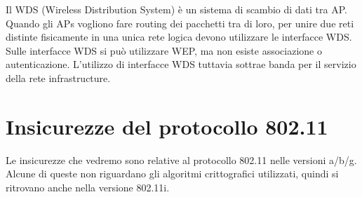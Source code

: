 Il WDS (Wireless Distribution System) è un sistema di scambio di dati tra AP. Quando gli APs vogliono fare routing dei pacchetti tra di loro, per unire due reti distinte fisicamente in una unica rete logica devono utilizzare le interfacce WDS. Sulle interfacce WDS si può utilizzare WEP, ma non esiste associazione o autenticazione. L'utilizzo di interfacce WDS tuttavia sottrae banda per il servizio della rete infrastructure.

\section{Insicurezze del protocollo 802.11}
Le insicurezze che vedremo sono relative al protocollo 802.11 nelle versioni a/b/g. Alcune di queste non riguardano gli algoritmi crittografici utilizzati, quindi si ritrovano anche nella versione 802.11i.

